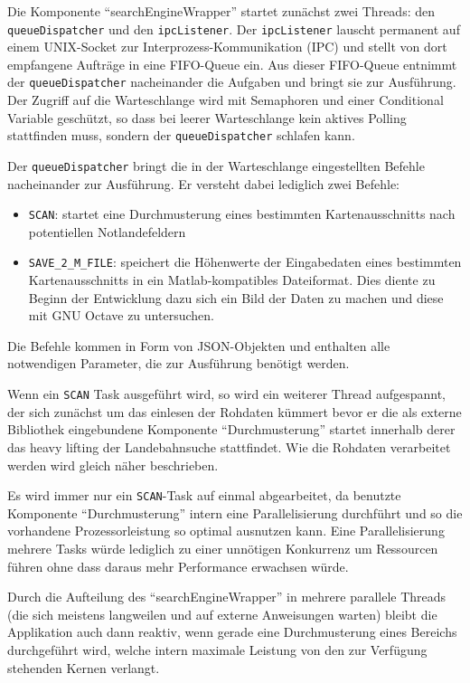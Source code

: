 \documentclass[10pt,a4paper]{report}
\begin{document}
Die Komponente "`searchEngineWrapper"' startet zunächst zwei Threads: den \verb|queueDispatcher| und den \verb|ipcListener|. Der  \verb|ipcListener| lauscht permanent auf einem UNIX-Socket zur Interprozess-Kommunikation (IPC) und stellt von dort empfangene Aufträge in eine FIFO-Queue ein. Aus dieser FIFO-Queue entnimmt der \verb|queueDispatcher| nacheinander die Aufgaben und bringt sie zur Ausführung. Der Zugriff auf die Warteschlange wird mit Semaphoren und einer Conditional Variable geschützt, so dass bei leerer Warteschlange kein aktives Polling stattfinden muss, sondern der \verb|queueDispatcher| schlafen kann.

Der \verb|queueDispatcher| bringt die in der Warteschlange eingestellten Befehle nacheinander zur Ausführung. Er versteht dabei lediglich zwei Befehle: 
\begin{itemize}
	\item \verb|SCAN|: startet eine Durchmusterung eines bestimmten Kartenausschnitts nach potentiellen Notlandefeldern
	\item \verb|SAVE_2_M_FILE|: speichert die Höhenwerte der Eingabedaten eines bestimmten Kartenausschnitts in ein Matlab-kompatibles Dateiformat. Dies diente zu Beginn der Entwicklung dazu sich ein Bild der Daten zu machen und diese mit GNU Octave zu untersuchen.
\end{itemize}
Die Befehle kommen in Form von JSON-Objekten und enthalten alle notwendigen Parameter, die zur Ausführung benötigt werden.

Wenn ein \verb|SCAN| Task ausgeführt wird, so wird ein weiterer Thread aufgespannt, der sich zunächst um das einlesen der Rohdaten kümmert bevor er die als externe Bibliothek eingebundene Komponente "`Durchmusterung"' startet innerhalb derer das heavy lifting der Landebahnsuche stattfindet. Wie die Rohdaten verarbeitet werden wird gleich näher beschrieben.

Es wird immer nur ein \verb|SCAN|-Task auf einmal abgearbeitet, da benutzte Komponente "`Durchmusterung"' intern eine Parallelisierung durchführt und so die vorhandene Prozessorleistung so optimal ausnutzen kann. Eine Parallelisierung mehrere Tasks würde lediglich zu einer unnötigen Konkurrenz um Ressourcen führen ohne dass daraus mehr Performance erwachsen würde.

Durch die Aufteilung des "`searchEngineWrapper"' in mehrere parallele Threads (die sich meistens langweilen und auf externe Anweisungen warten) bleibt die Applikation auch dann reaktiv, wenn gerade eine Durchmusterung eines Bereichs durchgeführt wird, welche intern maximale Leistung von den zur Verfügung stehenden Kernen verlangt.
\end{document}
